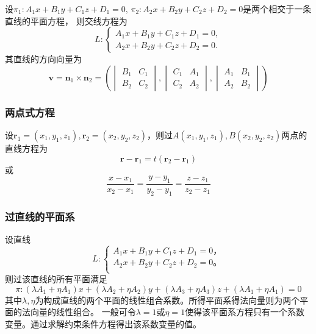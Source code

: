 设$\pi_1 : A_1x + B_1y + C_1z + D_1 = 0,\, \pi_2 : A_2x + B_2y + C_2z + D_2 = 0$是两个相交于一条直线的平面方程，
则交线方程为
\begin{equation}
    \label{eq:直线交面式方程}
    L:\begin{cases}
        A_1x + B_1y + C_1z + D_1 = 0, \\
        A_2x + B_2y + C_2z + D_2 = 0.
    \end{cases}
\end{equation}
其直线的方向向量为
\[
    \bm{v} = \bm{n}_1\times\bm{n}_2 =
    \left(
    \begin{vmatrix}
            B_1 & C_1 \\
            B_2 & C_2
        \end{vmatrix},
    \begin{vmatrix}
            C_1 & A_1 \\
            C_2 & A_2
        \end{vmatrix},
    \begin{vmatrix}
            A_1 & B_1 \\
            A_2 & B_2
        \end{vmatrix}
    \right)
\]

\subsubsection{两点式方程}
设$\bm{r}_1=(x_1,y_1,z_1),\bm{r}_2=(x_2,y_2,z_2)$，则过$A(x_1,y_1,z_1),B(x_2,y_2,z_2)$两点的直线方程为
\begin{equation}
    \bm{r}-\bm{r}_1 = t(\bm{r}_2-\bm{r}_1)
\end{equation}
或
\begin{equation}
    \label{eq:直线两点式方程}
    \frac{x-x_1}{x_2-x_1} = \frac{y-y_1}{y_2-y_1} = \frac{z-z_1}{z_2-z_1}
\end{equation}

\subsubsection{过直线的平面系}
设直线
\[
    L: \begin{cases}
        A_1x+B_1y+C_1z+D_1 = 0， \\
        A_2x+B_2y+C_2z+D_2 = 0。 \\
    \end{cases}
\]
则过该直线的所有平面满足
\begin{equation}
    \pi :  (\lambda A_1 + \eta A_1)x + (\lambda A_2 + \eta A_2)y + (\lambda A_3 + \eta A_3)z + (\lambda A_1 + \eta A_1)=0
\end{equation}
其中$\lambda,\eta$为构成直线的两个平面的线性组合系数。所得平面系得法向量则为两个平面的法向量的线性组合。
一般可令$\lambda=1$或$\eta=1$使得该平面系方程只有一个系数变量。通过求解约束条件方程得出该系数变量的值。

